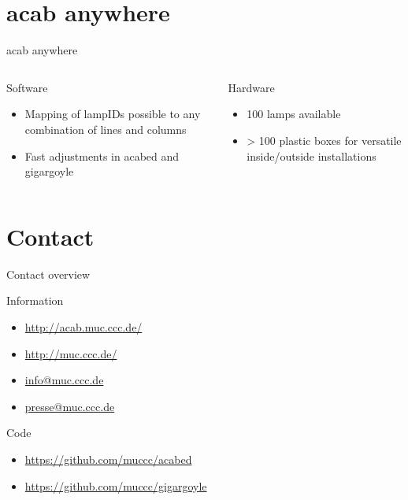 \documentclass{beamer}
\begin{document}
\section{acab anywhere}
  \begin{frame}{acab anywhere}
  \begin{columns}
    \begin{column}{5cm}
      Software
      \begin{itemize}
      \item Mapping of lampIDs possible to any combination of lines and columns\\
      \item Fast adjustments in acabed and gigargoyle
      \end{itemize}
    \end{column}
    \begin{column}{5cm}
    Hardware
      \begin{itemize}
      \item 100 lamps available
      \item > 100 plastic boxes for versatile inside/outside installations
      \end{itemize}
    \end{column}
  \end{columns}
\vskip 0.5cm
  \end{frame}

\section{Contact}
\begin{frame}{Contact overview}
  \begin{block}{Information}
    \begin{itemize}
      \item \url{http://acab.muc.ccc.de/}
      \item \url{http://muc.ccc.de/}
      \item \url{info@muc.ccc.de}
      \item \url{presse@muc.ccc.de}
    \end{itemize}
  \end{block}
  \begin{block}{Code}
    \begin{itemize}
      \item \url{https://github.com/muccc/acabed}
      \item \url{https://github.com/muccc/gigargoyle}
    \end{itemize}
  \end{block}
\end{frame}
\end{document}
